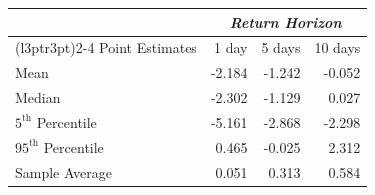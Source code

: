 
\begin{tabular}{lrrr}
\toprule
\multicolumn{1}{c}{\em{ }} & \multicolumn{3}{c}{\em{Return Horizon}} \\
\cmidrule(l{3pt}r{3pt}){2-4}
Point Estimates & 1 day & 5 days & 10 days\\
\midrule
Mean & -2.184 & -1.242 & -0.052\\
Median & -2.302 & -1.129 & 0.027\\
$5^\text{th}$ Percentile & -5.161 & -2.868 & -2.298\\
$95^\text{th}$ Percentile & 0.465 & -0.025 & 2.312\\
\midrule
Sample Average & 0.051 & 0.313 & 0.584\\
\bottomrule
\end{tabular}
